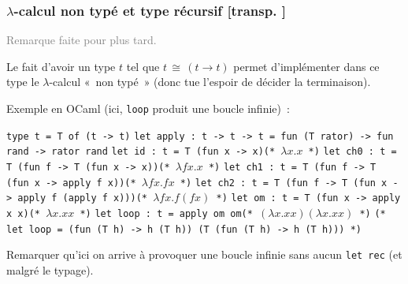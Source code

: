 \documentclass[mathserif,a4paper,aspectratio=169]{beamer}
\renewcommand{\frametitle}[1]{\subsubsection*{#1 {\footnotesize[transp. \insertframenumber]}}}
\begin{document}
\begin{frame}
\frametitle{$\lambda$-calcul non typé et type récursif}

{\footnotesize\textcolor{gray}{Remarque faite pour plus tard.}\par}

\smallskip

Le fait d'avoir un type $t$ tel que $t \,\cong\, (t\rightarrow t)$
permet d'implémenter dans ce type le $\lambda$-calcul « non typé »
(donc tue l'espoir de décider la terminaison).

\bigskip

Exemple en OCaml (ici, \texttt{loop} produit une boucle infinie) :

\smallskip

{\footnotesize
\texttt{type t = T of (t -> t)}\newline
\texttt{let apply : t -> t -> t = fun (T rator) -> fun rand -> rator rand}\newline
\texttt{let id : t = T (fun x -> x)}\hfill\texttt{(* }$\lambda x.x$\texttt{ *)}\newline
\texttt{let ch0 : t = T (fun f -> T (fun x -> x))}\hfill\texttt{(* }$\lambda fx.x$\texttt{ *)}\newline
\texttt{let ch1 : t = T (fun f -> T (fun x -> apply f x))}\hfill\texttt{(* }$\lambda fx.fx$\texttt{ *)}\newline
\texttt{let ch2 : t = T (fun f -> T (fun x -> apply f (apply f x)))}\hfill\texttt{(* }$\lambda fx.f(fx)$\texttt{ *)}\newline
\texttt{let om : t = T (fun x -> apply x x)}\hfill\texttt{(* }$\lambda x.xx$\texttt{ *)}\newline
\texttt{let loop : t = apply om om}\hfill\texttt{(* }$(\lambda x.xx)(\lambda x.xx)$\texttt{ *)}\newline
\texttt{(* let loop = (fun (T h) -> h (T h)) (T (fun (T h) -> h (T h))) *)}\newline
\par}

\medskip

Remarquer qu'ici on arrive à provoquer une boucle infinie sans aucun
\texttt{let rec} (et malgré le typage).

\end{frame}
%
\end{document}
